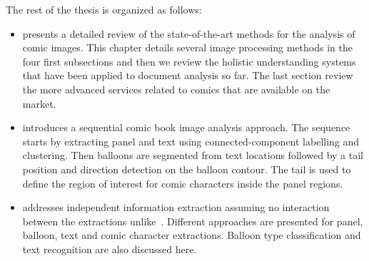 The rest of the thesis is organized as follows:
\begin{itemize}
\item {} presents a detailed review of the state-of-the-art methods for the analysis of comic images. This chapter details several image processing methods in the four first subsections and then we review the holistic understanding systems that have been applied to document analysis so far.
The last section review the more advanced services related to comics that are available on the market.

\item {} introduces a sequential comic book image analysis approach.
The sequence starts by extracting panel and text using connected-component labelling and clustering.
Then balloons are segmented from text locations followed by a tail position and direction detection on the balloon contour.
The tail is used to define the region of interest for comic characters inside the panel regions.

\item {} addresses independent information extraction assuming no interaction between the extractions unlike~.
Different approaches are presented for panel, balloon, text and comic character extractions.
Balloon type classification and text recognition are also discussed here.




\end{itemize}
